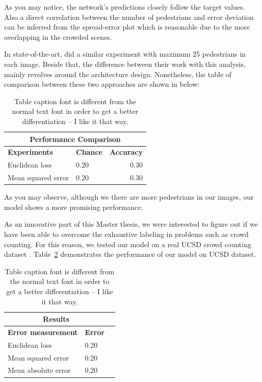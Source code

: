 As you may notice, the network's predictions closely follow the target values. Also a direct correlation between the number of pedestrians and error deviation can be inferred from the spread-error plot which is reasonable due to the more overlapping in the crowded scenes. 

\noindent In state-of-the-art, \citeauthor*{segui2015learning} did a similar experiment with maximum 25 pedestrians in each image. Beside that, the difference between their work with this analysis, mainly revolves around the architecture design. Nonetheless, the table of comparison between these two approaches are shown in below:
 
\begin{table}[H]
\centering
\small\sffamily
\begin{tabular}{llr}
\multicolumn{3}{c}{\textbf{\textbf{Performance Comparison}}} \\
\bottomrule
\textbf{Experiments}  & \textbf{Chance} & \textbf{Accuracy} \\
\bottomrule
Euclidean loss           & 0.20 & 0.30 \\
Mean squared error       & 0.20 & 0.30 \\
\bottomrule
\end{tabular}
\caption{Table caption font is different from the normal text font in order to get a better differentiation -- I like it that way.}
\label{tab:}
\end{table} 

As you may observe, although we there are more pedestrians in our images, our model shows a more promising performance. 

\noindent As an innovative part of this Master thesis, we were interested to figure out if we have been able to overcome the exhaustive labeling in problems such as crowd counting. For this reason, we tested our model on a real UCSD crowd counting dataset \cite{chan2008privacy}. Table~\ref{tab:ucsdreal} demonstrates the performance of our model on UCSD dataset.


\begin{table}[H]
\centering
\small\sffamily
\begin{tabular}{llr}
\multicolumn{2}{c}{\textbf{\textbf{Results}}} \\
\bottomrule
\textbf{Error measurement}        & \textbf{Error} \\
\bottomrule
Euclidean loss           & 0.20  \\
Mean squared error       & 0.20  \\
Mean absolute error      & 0.20  \\
\bottomrule
\end{tabular}
\caption{Table caption font is different from the normal text font in order to get a better differentiation -- I like it that way.}
\label{tab:ucsdreal}
\end{table} 

